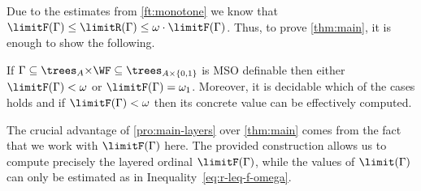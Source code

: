 \documentclass{lmcs}
\numberwithin{equation}{section}
\numberwithin{figure}{section}
\begin{document}
Due to the estimates from \cref{ft:monotone}
we know that $\limitF(\Gamma)\leq \limitR(\Gamma) \leq \omega\cdot \limitF(\Gamma)$.
Thus, to prove \cref{thm:main}, it is enough to show the following.

\begin{prop}\label{pro:main-layers}
	If $\Gamma\subseteq \trees_A{\times} \WF\subseteq \trees_{A\times\{0,1\}}$ is MSO definable then either $\limitF(\Gamma)< \omega$ or $\limitF(\Gamma)=\omega_1$.
	Moreover, it is decidable which of the cases holds and if $\limitF(\Gamma)<\omega$ then its concrete value can be effectively computed.
\end{prop}

\noindent %
The crucial advantage of \cref{pro:main-layers} over \cref{thm:main} comes from the fact that we work with $\limitF(\Gamma)$ here.
The provided construction allows us to compute precisely the layered ordinal $\limitF(\Gamma)$, while the values of $\limit(\Gamma)$ can only be estimated as in Inequality~\eqref{eq:r-leq-f-omega}.
\end{document}
